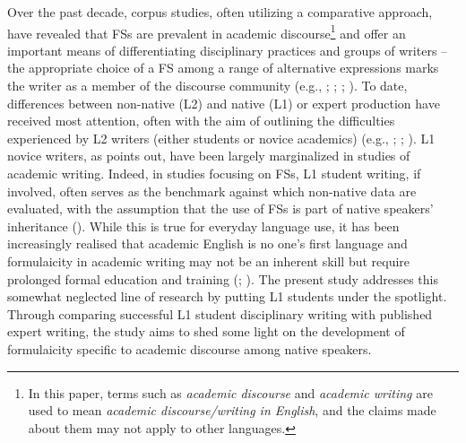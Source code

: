 \documentclass[output=paper]{langscibook}
\begin{document}
Over the past decade, corpus studies, often utilizing a comparative approach, have revealed that FSs are prevalent in academic discourse\footnote{In this paper, terms such as \textit{academic discourse} and \textit{academic writing} are used to mean \textit{academic discourse/writing in English}, and the claims made about them may not apply to other languages.} and offer an important means of differentiating disciplinary practices and groups of writers – the appropriate choice of a FS among a range of alternative expressions marks the writer as a member of the discourse community (e.g., \citealt{BiberEtAl2004}; \citealt{Cortes2004}; \citealt{Hyland2008Lexical,Hyland2012}; \citealt{Durrant2017}). To date, differences between non-native (L2) and native (L1) or expert production have received most attention, often with the aim of outlining the difficulties experienced by L2 writers (either students or novice academics) (e.g., \citealt{Hyland2008Academic}; \citealt{ChenBaker2010}; \citealt{ÄdelErman2012}). L1 novice writers, as \citet{Hyland2016} points out, have been largely marginalized in studies of academic writing. Indeed, in studies focusing on FSs, L1 student writing, if involved, often serves as the benchmark against which non-native data are evaluated, with the assumption that the use of FSs is part of native speakers’ inheritance (\citealt{WrayPerkins2000}). While this is true for everyday language use, it has been increasingly realised that academic English is no one’s first language and formulaicity in academic writing may not be an inherent skill but require prolonged formal education and training (\citealt{FergusonEtAl2011}; \citealt{Pérez-Llantada2014}). The present study addresses this somewhat neglected line of research by putting L1 students under the spotlight. Through comparing successful L1 student disciplinary writing with published expert writing, the study aims to shed some light on the development of formulaicity specific to academic discourse among native speakers. 
\end{document}
